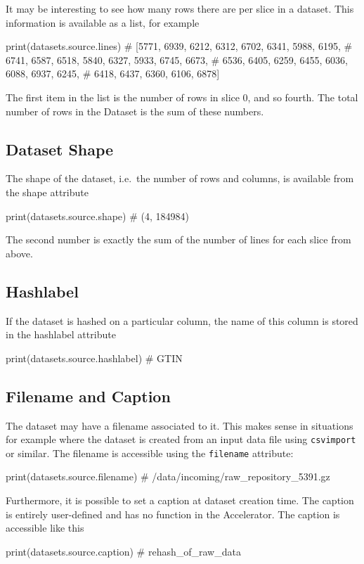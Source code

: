 It may be interesting to see how many rows there are per slice in a
dataset.  This information is available as a list, for example
\begin{python}
print(datasets.source.lines)
# [5771, 6939, 6212, 6312, 6702, 6341, 5988, 6195,
#  6741, 6587, 6518, 5840, 6327, 5933, 6745, 6673,
#  6536, 6405, 6259, 6455, 6036, 6088, 6937, 6245,
#  6418, 6437, 6360, 6106, 6878]
\end{python}
The first item in the list is the number of rows in slice 0, and so
fourth.  The total number of rows in the Dataset is the sum of these
numbers.


\subsection{Dataset Shape}
The shape of the dataset, i.e.\ the number of rows and columns, is
available from the shape attribute
\begin{python}
print(datasets.source.shape)
# (4, 184984)
\end{python}
The second number is exactly the sum of the number of lines for each
slice from above.


\subsection{Hashlabel}
If the dataset is hashed on a particular column, the name of this
column is stored in the hashlabel attribute
\begin{python}
print(datasets.source.hashlabel)
# GTIN
\end{python}



\subsection{Filename and Caption}
The dataset may have a filename associated to it.  This makes sense in
situations for example where the dataset is created from an input data
file using \texttt{csvimport} or similar.  The filename is accessible
using the \texttt{filename} attribute:
\begin{python}
print(datasets.source.filename)
# /data/incoming/raw_repository_5391.gz
\end{python}
Furthermore, it is possible to set a caption at dataset creation time.
The caption is entirely user-defined and has no function in the
Accelerator.  The caption is accessible like this
\begin{python}
print(datasets.source.caption)
# rehash_of_raw_data
\end{python}



